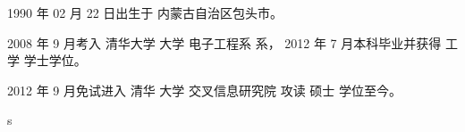 
\begin{resume}


  1990 年 02 月 22 日出生于 内蒙古自治区包头市。
  
  2008 年 9 月考入 清华大学 大学 电子工程系 系， 2012 年 7 月本科毕业并获得 工学 学士学位。
  
  2012 年 9 月免试进入 清华 大学 交叉信息研究院 攻读 硕士 学位至今。


  \begin{enumerate}[{[}1{]}]
  \item s
  \end{enumerate}
\end{resume}

